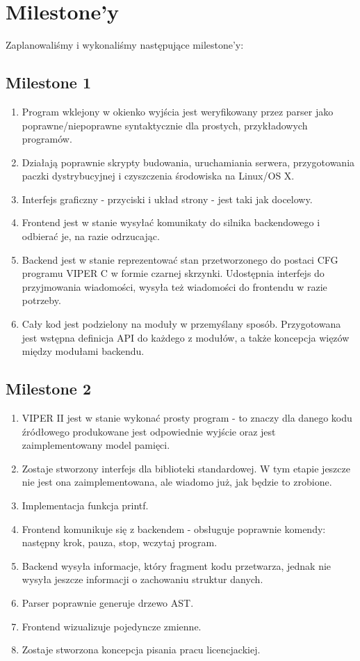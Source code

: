 \documentclass[a4paper,twoside,openright,11pt]{report}
\begin{document}
  \section {Milestone'y}
\par Zaplanowaliśmy i wykonaliśmy następujące milestone'y:
  \subsection {Milestone 1}
  \begin {enumerate}
    \item Program wklejony w okienko wyjścia jest weryfikowany przez parser jako poprawne/niepoprawne syntaktycznie dla prostych, przykładowych programów.
    \item Działają poprawnie skrypty budowania, uruchamiania serwera, przygotowania paczki dystrybucyjnej i czyszczenia środowiska na Linux/OS X.
    \item Interfejs graficzny - przyciski i układ strony - jest taki jak docelowy. 
    \item Frontend jest w stanie wysyłać komunikaty do silnika backendowego i odbierać je, na razie odrzucając.
    \item Backend jest w stanie reprezentować stan przetworzonego do postaci CFG  programu VIPER C w formie czarnej skrzynki. Udostępnia interfejs do przyjmowania wiadomości, wysyła też wiadomości do frontendu w razie potrzeby.
    \item Cały kod jest podzielony na moduły w przemyślany sposób.
Przygotowana jest wstępna definicja API do każdego z modułów, a także koncepcja więzów między modułami backendu.
  \end {enumerate}
  \subsection {Milestone 2}
  \begin {enumerate}
    \item VIPER II jest w stanie wykonać prosty program - to znaczy dla danego kodu źródłowego produkowane jest odpowiednie wyjście oraz jest zaimplementowany model pamięci.
    \item Zostaje stworzony interfejs dla biblioteki standardowej. W tym etapie jeszcze nie jest ona zaimplementowana, ale wiadomo już, jak będzie to zrobione. 
    \item Implementacja funkcja printf.
    \item Frontend komunikuje się z backendem - obsługuje poprawnie komendy: następny krok, pauza, stop, wczytaj program. 
    \item Backend wysyła informacje, który fragment kodu przetwarza, jednak nie wysyła jeszcze informacji o zachowaniu struktur danych.
    \item Parser poprawnie generuje drzewo AST.
    \item Frontend wizualizuje pojedyncze zmienne.
    \item Zostaje stworzona koncepcja pisania pracu licencjackiej.
  \end {enumerate}
\end{document}
